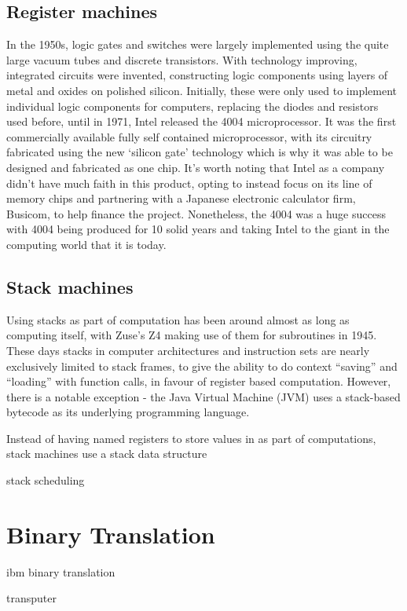 \documentclass[11pt,a4paper,notitlepage]{report}
\begin{document}
\subsection{Register machines}
In the 1950s, logic gates and switches were largely implemented using the quite
large vacuum tubes and discrete transistors. With technology improving,
integrated circuits were invented, constructing logic components using layers of
metal and oxides on polished silicon. Initially, these were only used to
implement individual logic components for computers, replacing the diodes and
resistors used before, until in 1971, Intel released the 4004 microprocessor.
It was the first commercially available fully self contained microprocessor,
with its circuitry fabricated using the new `silicon gate' technology which is
why it was able to be designed and fabricated as one chip. It's worth noting
that Intel as a company didn't have much faith in this product, opting to
instead focus on its line of memory chips and partnering with a Japanese
electronic calculator firm, Busicom, to help finance the project. Nonetheless,
the 4004 was a huge success with 4004 being produced for 10 solid years and
taking Intel to the giant in the computing world that it is
today.\cite{Aspray1997Intel}

\subsection{Stack machines}
Using stacks as part of computation has been around almost as long as computing
itself, with Zuse's Z4 making use of them for subroutines in
1945.\cite{Speiser2000KZZ} These days stacks in computer architectures and
instruction sets are nearly exclusively limited to stack frames, to give the
ability to do context ``saving'' and ``loading'' with function calls, in favour
of register based computation. However, there is a notable exception - the Java
Virtual Machine (JVM) uses a stack-based bytecode as its underlying programming
language.\cite{Schoeberl2005Design}

Instead of having named registers to store values in as part of computations,
stack machines use a stack data structure


stack scheduling


\section{Binary Translation}
ibm binary translation

transputer
\end{document}
